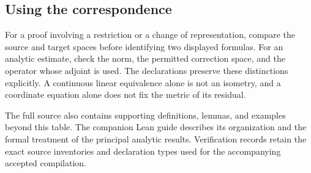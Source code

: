 

\subsection{Using the correspondence}
For a proof involving a restriction or a change of representation, compare the source and target spaces before identifying two displayed formulas. For an analytic estimate, check the norm, the permitted correction space, and the operator whose adjoint is used. The declarations preserve these distinctions explicitly. A continuous linear equivalence alone is not an isometry, and a coordinate equation alone does not fix the metric of its residual.

The full source also contains supporting definitions, lemmas, and examples beyond this table. The companion Lean guide describes its organization and the formal treatment of the principal analytic results. Verification records retain the exact source inventories and declaration types used for the accompanying accepted compilation.
